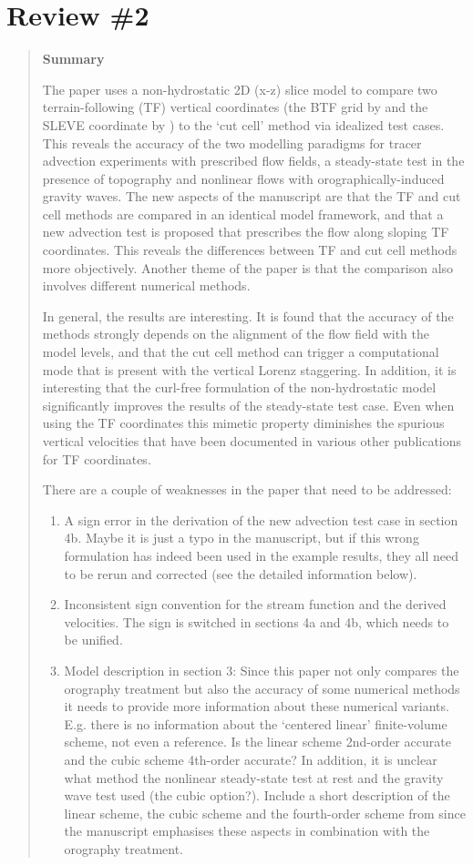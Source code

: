 \documentclass{article}
\begin{document}
\section*{Review \#2}
\begin{quotation}
\noindent
\textbf{Summary}

\noindent The paper uses a non-hydrostatic 2D (x-z) slice model to compare two terrain-following (TF) vertical coordinates (the BTF grid by \citet{galchen-somerville1975} and the SLEVE coordinate by \citet{schaer2002}) to the `cut cell' method via idealized test cases.
This reveals the accuracy of the two modelling paradigms for tracer advection experiments with prescribed flow fields, a steady-state test in the presence of topography and nonlinear flows with orographically-induced gravity waves.  The new aspects of the manuscript are that the TF and cut cell methods are compared in an identical model framework, and that a new advection test is proposed that prescribes the flow along sloping TF coordinates.  This reveals the differences between TF and cut cell methods more objectively.
Another theme of the paper is that the comparison also involves different numerical methods.

In general, the results are interesting.  It is found that the accuracy of the methods strongly depends on the alignment of the flow field with the model levels, and that the cut cell method can trigger a computational mode that is present with the vertical Lorenz staggering.
In addition, it is interesting that the curl-free formulation of the non-hydrostatic model significantly improves the results of the steady-state test case.
Even when using the TF coordinates this mimetic property diminishes the spurious vertical velocities that have been documented in various other publications for TF coordinates.


There are a couple of weaknesses in the paper that need to be addressed:
\begin{enumerate}
\item A sign error in the derivation of the new advection test case in section 4b.
	Maybe it is just a typo in the manuscript, but if this wrong formulation has indeed been used
	in the example results, they all need to be rerun and corrected (see the detailed information below).
\item Inconsistent sign convention for the stream function and the derived velocities.  The sign is switched in sections 4a and 4b, which needs to be unified.
\item Model description in section 3: Since this paper not only compares the orography treatment but also the accuracy of some numerical methods it needs to provide more information about these numerical variants.  E.g. there is no information about the `centered linear' finite-volume scheme, not even a reference.  Is the linear scheme 2nd-order accurate and the cubic scheme 4th-order accurate?  In addition, it is unclear what method the nonlinear steady-state test at rest and the gravity wave test used (the cubic option?).  Include a short description of the linear scheme, the cubic scheme and the fourth-order scheme from \cite{schaer2002} since the manuscript emphasises these aspects in combination with the orography treatment.


\end{enumerate}
\end{quotation}
\end{document}
